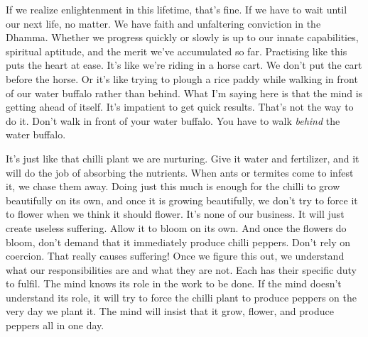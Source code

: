 If we realize enlightenment in this lifetime, that's fine. If we have to wait until our next life, no matter. We have faith and unfaltering conviction in the Dhamma. Whether we progress quickly or slowly is up to our innate capabilities, spiritual aptitude, and the merit we've accumulated so far. Practising like this puts the heart at ease. It's like we're riding in a horse cart. We don't put the cart before the horse. Or it's like trying to plough a rice paddy while walking in front of our water buffalo rather than behind. What I'm saying here is that the mind is getting ahead of itself. It's impatient to get quick results. That's not the way to do it. Don't walk in front of your water buffalo. You have to walk \textit{behind} the water buffalo.

It's just like that chilli plant we are nurturing. Give it water and fertilizer, and it will do the job of absorbing the nutrients. When ants or termites come to infest it, we chase them away. Doing just this much is enough for the chilli to grow beautifully on its own, and once it is growing beautifully, we don't try to force it to flower when we think it should flower. It's none of our business. It will just create useless suffering. Allow it to bloom on its own. And once the flowers do bloom, don't demand that it immediately produce chilli peppers. Don't rely on coercion. That really causes suffering! Once we figure this out, we understand what our responsibilities are and what they are not. Each has their specific duty to fulfil. The mind knows its role in the work to be done. If the mind doesn't understand its role, it will try to force the chilli plant to produce peppers on the very day we plant it. The mind will insist that it grow, flower, and produce peppers all in one day.

